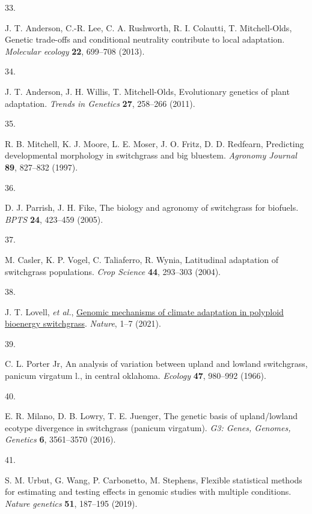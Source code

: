 \documentclass[
  9pt,
  twocolumn,
  twoside]{pnas-new}
\newlength{\cslhangindent}
\newlength{\csllabelwidth}
\newenvironment{CSLReferences}[2] %
 {\begin{list}{}{%
  \setlength{\itemindent}{0pt}
  \setlength{\leftmargin}{0pt}
  \setlength{\parsep}{0pt}
  \ifodd #1
   \setlength{\leftmargin}{\cslhangindent}
   \setlength{\itemindent}{-1\cslhangindent}
  \fi
  \setlength{\itemsep}{#2\baselineskip}}}
 {\end{list}}
\newcommand{\CSLLeftMargin}[1]{\parbox[t]{\csllabelwidth}{\strut#1\strut}}
\newcommand{\CSLRightInline}[1]{\parbox[t]{\linewidth - \csllabelwidth}{\strut#1\strut}}
\begin{document}
\begin{CSLReferences}{0}{1}
\CSLLeftMargin{33. }%
\CSLRightInline{J. T. Anderson, C.-R. Lee, C. A. Rushworth, R. I.
Colautti, T. Mitchell-Olds, Genetic trade-offs and conditional
neutrality contribute to local adaptation. \emph{Molecular ecology}
\textbf{22}, 699--708 (2013).}

\CSLLeftMargin{34. }%
\CSLRightInline{J. T. Anderson, J. H. Willis, T. Mitchell-Olds,
Evolutionary genetics of plant adaptation. \emph{Trends in Genetics}
\textbf{27}, 258--266 (2011).}

\CSLLeftMargin{35. }%
\CSLRightInline{R. B. Mitchell, K. J. Moore, L. E. Moser, J. O. Fritz,
D. D. Redfearn, Predicting developmental morphology in switchgrass and
big bluestem. \emph{Agronomy Journal} \textbf{89}, 827--832 (1997).}

\CSLLeftMargin{36. }%
\CSLRightInline{D. J. Parrish, J. H. Fike, The biology and agronomy of
switchgrass for biofuels. \emph{BPTS} \textbf{24}, 423--459 (2005).}

\CSLLeftMargin{37. }%
\CSLRightInline{M. Casler, K. P. Vogel, C. Taliaferro, R. Wynia,
Latitudinal adaptation of switchgrass populations. \emph{Crop Science}
\textbf{44}, 293--303 (2004).}

\CSLLeftMargin{38. }%
\CSLRightInline{J. T. Lovell, \emph{et al.},
\href{https://doi.org/10.1038/s41586-020-03127-1}{Genomic mechanisms of
climate adaptation in polyploid bioenergy switchgrass}. \emph{Nature},
1--7 (2021).}

\CSLLeftMargin{39. }%
\CSLRightInline{C. L. Porter Jr, An analysis of variation between upland
and lowland switchgrass, panicum virgatum l., in central oklahoma.
\emph{Ecology} \textbf{47}, 980--992 (1966).}

\CSLLeftMargin{40. }%
\CSLRightInline{E. R. Milano, D. B. Lowry, T. E. Juenger, The genetic
basis of upland/lowland ecotype divergence in switchgrass (panicum
virgatum). \emph{G3: Genes, Genomes, Genetics} \textbf{6}, 3561--3570
(2016).}

\CSLLeftMargin{41. }%
\CSLRightInline{S. M. Urbut, G. Wang, P. Carbonetto, M. Stephens,
Flexible statistical methods for estimating and testing effects in
genomic studies with multiple conditions. \emph{Nature genetics}
\textbf{51}, 187--195 (2019).}


\end{CSLReferences}
\end{document}

